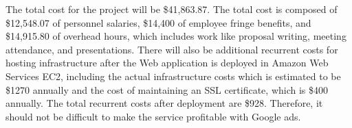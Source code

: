 
The total cost for the project will be \$41,863.87. The total cost is composed
of \$12,548.07 of personnel salaries, \$14,400 of employee fringe benefits, and
\$14,915.80 of overhead hours, which includes work like proposal writing,
meeting attendance, and presentations. There will also be additional recurrent
costs for hosting infrastructure after the Web application is deployed in
Amazon Web Services EC2, including the actual infrastructure costs which is
estimated to be \$1270 annually and the cost of maintaining an SSL certificate,
which is \$400 annually. The total recurrent costs after deployment are \$928.
Therefore, it should not be difficult to make the service profitable with
Google ads.


